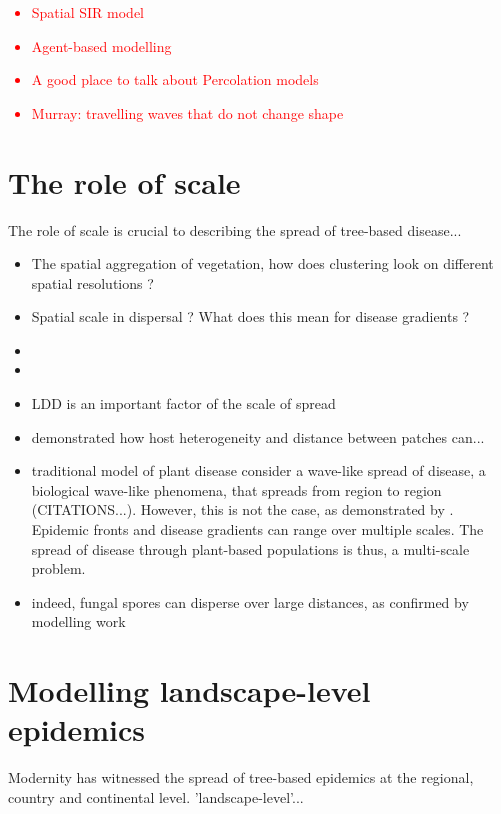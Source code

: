 \textcolor{red}{
\begin{itemize}
    \item Spatial SIR model
    \item Agent-based modelling
    \item A good place to talk about Percolation models
    \item \textcolor{red}{Murray}: travelling waves that do not change shape
\end{itemize}}

\section{The role of scale}
The role of scale is crucial to describing the spread of tree-based disease...
\begin{itemize}
    \item The spatial aggregation of vegetation, how does clustering look on different spatial resolutions ?
    \item Spatial scale in dispersal ? What does this mean for disease gradients ?
    \item %
    \item %
    \item LDD is an important factor of the scale of spread 
    \item \cite{wingen2013long} demonstrated how host heterogeneity and distance between patches can...
    \item traditional model of plant disease consider a wave-like spread of disease, a biological wave-like phenomena, that spreads from region to region (CITATIONS...).
    However, this is not the case, as demonstrated by \cite{mundt2009aerial}. Epidemic fronts and disease gradients can range over multiple scales. The spread of disease through plant-based populations is thus, a multi-scale problem.
    \item indeed, fungal spores can disperse over large distances, as confirmed by modelling work \cite{shaw2006assembling} 
\end{itemize}

\section{Modelling landscape-level epidemics}

Modernity has witnessed the spread of tree-based epidemics at the regional, country and continental level. 'landscape-level'...

